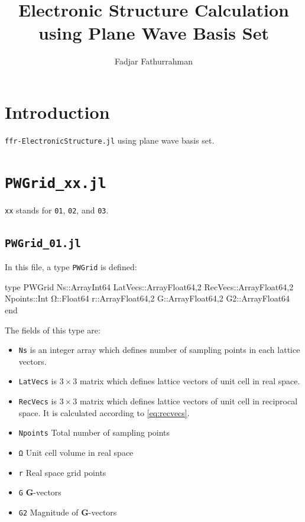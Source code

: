 \documentclass[a4paper,11pt]{extarticle}
\begin{document}
\title{Electronic Structure Calculation using Plane Wave Basis Set}
\author{Fadjar Fathurrahman}
\date{}
\maketitle

\tableofcontents

\section{Introduction}

{\tt ffr-ElectronicStructure.jl} using plane wave basis set.

\section{ {\tt PWGrid\_xx.jl} }

{\tt xx} stands for {\tt 01}, {\tt 02}, and {\tt 03}.


\subsection{ {\tt PWGrid\_01.jl} }

In this file, a type {\tt PWGrid} is defined:
\begin{juliacode}
type PWGrid
  Ns::Array{Int64}
  LatVecs::Array{Float64,2}
  RecVecs::Array{Float64,2}
  Npoints::Int
  Ω::Float64
  r::Array{Float64,2}
  G::Array{Float64,2}
  G2::Array{Float64}
end
\end{juliacode}

The fields of this type are:
\begin{itemize}

\item {\tt Ns} is an integer array which defines number of sampling points
in each lattice vectors.

\item {\tt LatVecs} is $3\times3$ matrix which defines lattice vectors of
unit cell in real space.

\item {\tt RecVecs} is $3\times3$ matrix which defines lattice vectors of
unit cell in reciprocal space. It is calculated according to \eqref{eq:recvecs}.

\item {\tt Npoints} Total number of sampling points
\item {\tt Ω} Unit cell volume in real space
\item {\tt r} Real space grid points
\item {\tt G} \textbf{G}-vectors
\item {\tt G2} Magnitude of \textbf{G}-vectors

\end{itemize}
\end{document}
